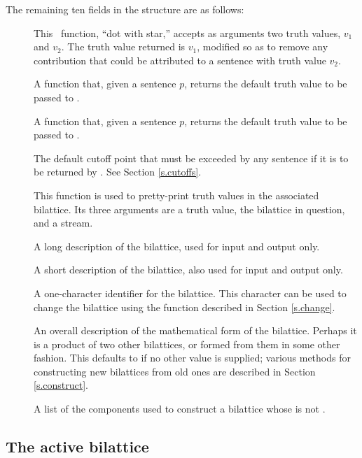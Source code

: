 The remaining ten fields in the  structure are as
follows:
 \begin{description}
 \item [] This \lisp\ function, ``dot with star,'' accepts
as arguments two truth values, $v_1$ and $v_2$.  The truth value returned
is $v_1$, modified so as to remove any contribution that could be
attributed to a sentence with truth value $v_2$.
 \item [] A function that, given a sentence $p$,
returns the default truth value to be passed to .
 \item [] A function that, given a sentence $p$,
returns the default truth value to be passed to .
 \item [] The default cutoff point that must be
exceeded by any sentence if it is to be returned by .
See Section \ref{s.cutoffs}.
 \item [] This function is used to pretty-print
truth values in the associated bilattice.  Its three arguments
are a truth value, the bilattice in question, and a stream.
 \item [] A long description of the bilattice, used
for input and output only.
 \item [] A short description of the bilattice, also
used for input and output only.
 \item [] A one-character identifier for the bilattice.
This character can be used to change the bilattice using the function
 described in Section \ref{s.change}.
 \item [] An overall description of the mathematical form
of the bilattice.  Perhaps it is a product of two other bilattices,
or formed from them in some other fashion.  This defaults to 
if no other value is supplied; various methods for constructing new
bilattices from old ones are described in Section \ref{s.construct}. 
 \item []  A list of the components used to construct
a bilattice whose  is not .
 \end{description}

\subsection{The active bilattice}

